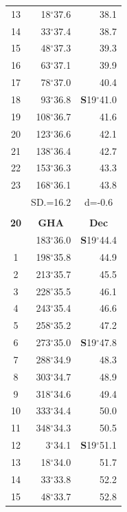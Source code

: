 \documentclass[10pt, a4paper]{report}
\begin{document}
\begin{scriptsize}
\begin{tabular*}{0.2\textwidth}[t]{@{\extracolsep{\fill}}|c|rr|}
13 & 18$^\circ$37.6 & 38.1\\
14 & 33$^\circ$37.4 & 38.7\\
15 & 48$^\circ$37.3 & \raisebox{0.24ex}{\boldmath$\cdot$~\boldmath$\cdot$~~}39.3\\
16 & 63$^\circ$37.1 & 39.9\\
17 & 78$^\circ$37.0 & 40.4\\[2Pt]
18 & 93$^\circ$36.8 & \textbf{S}19$^\circ$41.0\\
19 & 108$^\circ$36.7 & 41.6\\
20 & 123$^\circ$36.6 & 42.1\\
21 & 138$^\circ$36.4 & \raisebox{0.24ex}{\boldmath$\cdot$~\boldmath$\cdot$~~}42.7\\
22 & 153$^\circ$36.3 & 43.3\\
23 & 168$^\circ$36.1 & 43.8\\
\hline
\rule{0pt}{2.4ex} & \multicolumn{1}{c}{SD.=16.2} & \multicolumn{1}{c|}{d=-0.6}\\
\hline
\multicolumn{1}{c}{}\\[-0.5ex]\hline
\multicolumn{1}{|c|}{\rule{0pt}{2.6ex}\textbf{20}} & \multicolumn{1}{c}{\textbf{GHA}} & \multicolumn{1}{c|}{\textbf{Dec}}\\
\hline\rule{0pt}{2.6ex}\noindent
0 & 183$^\circ$36.0 & \textbf{S}19$^\circ$44.4\\
1 & 198$^\circ$35.8 & 44.9\\
2 & 213$^\circ$35.7 & 45.5\\
3 & 228$^\circ$35.5 & \raisebox{0.24ex}{\boldmath$\cdot$~\boldmath$\cdot$~~}46.1\\
4 & 243$^\circ$35.4 & 46.6\\
5 & 258$^\circ$35.2 & 47.2\\[2Pt]
6 & 273$^\circ$35.0 & \textbf{S}19$^\circ$47.8\\
7 & 288$^\circ$34.9 & 48.3\\
8 & 303$^\circ$34.7 & 48.9\\
9 & 318$^\circ$34.6 & \raisebox{0.24ex}{\boldmath$\cdot$~\boldmath$\cdot$~~}49.4\\
10 & 333$^\circ$34.4 & 50.0\\
11 & 348$^\circ$34.3 & 50.5\\[2Pt]
12 & 3$^\circ$34.1 & \textbf{S}19$^\circ$51.1\\
13 & 18$^\circ$34.0 & 51.7\\
14 & 33$^\circ$33.8 & 52.2\\
15 & 48$^\circ$33.7 & \raisebox{0.24ex}{\boldmath$\cdot$~\boldmath$\cdot$~~}52.8\\

\end{tabular*}
\end{scriptsize}
\end{document}
